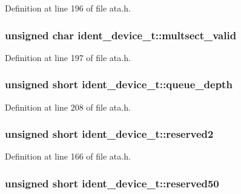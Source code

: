 Definition at line 196 of file ata.\+h.

\subsubsection[{\texorpdfstring{multsect\+\_\+valid}{multsect_valid}}]{\setlength{\rightskip}{0pt plus 5cm}unsigned char ident\+\_\+device\+\_\+t\+::multsect\+\_\+valid}\hypertarget{structident__device__t_a6749281572514b27f7e71126f9f8df1c}{}\label{structident__device__t_a6749281572514b27f7e71126f9f8df1c}


Definition at line 197 of file ata.\+h.

\subsubsection[{\texorpdfstring{queue\+\_\+depth}{queue_depth}}]{\setlength{\rightskip}{0pt plus 5cm}unsigned short ident\+\_\+device\+\_\+t\+::queue\+\_\+depth}\hypertarget{structident__device__t_ac1f7e4bfd3701c7823bec39bafa1292b}{}\label{structident__device__t_ac1f7e4bfd3701c7823bec39bafa1292b}


Definition at line 208 of file ata.\+h.

\subsubsection[{\texorpdfstring{reserved2}{reserved2}}]{\setlength{\rightskip}{0pt plus 5cm}unsigned short ident\+\_\+device\+\_\+t\+::reserved2}\hypertarget{structident__device__t_ab16b1b188cf48d9f8e7b510e3eb9933c}{}\label{structident__device__t_ab16b1b188cf48d9f8e7b510e3eb9933c}


Definition at line 166 of file ata.\+h.

\subsubsection[{\texorpdfstring{reserved50}{reserved50}}]{\setlength{\rightskip}{0pt plus 5cm}unsigned short ident\+\_\+device\+\_\+t\+::reserved50}\hypertarget{structident__device__t_ae77410f26a7ef148d5d17fb5a068f135}{}\label{structident__device__t_ae77410f26a7ef148d5d17fb5a068f135}


